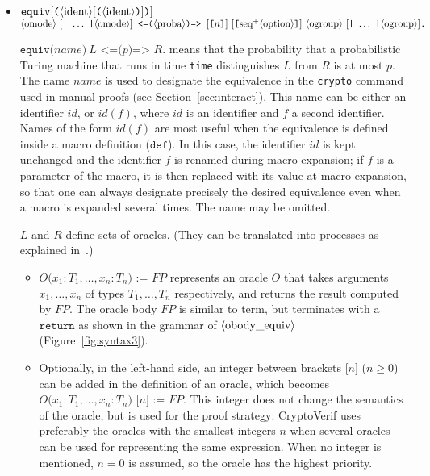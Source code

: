 \begin{itemize}
\ifchannels
\item $\texttt{equiv}[\texttt{(}\langle\textrm{ident}\rangle[\texttt{(}\langle\textrm{ident}\rangle\texttt{)}]\texttt{)}]$\\
$\nonterm{omode}\ [\texttt{|}\ \ldots\ \texttt{|}\nonterm{omode}]\texttt{ <=(}\nonterm{proba}\texttt{)=> }
[\texttt{[}n\texttt{]}]\ [\texttt{[}\neseq{option}\texttt{]}]\ \nonterm{ogroup}\ [\texttt{|}\ \ldots\ \texttt{|}\nonterm{ogroup}]\texttt{.}$

$\texttt{equiv(}\mathit{name}\texttt{)}\ L\texttt{ <=(}p\texttt{)=> }R\texttt{.}$ means that the
probability that a probabilistic Turing machine that runs in time
{\tt time} distinguishes $L$ from $R$ is at most $p$. The name $\mathit{name}$
is used to designate the equivalence in the \texttt{crypto} command used in manual proofs (see Section~\ref{sec:interact}). This name can be either an identifier $\mathit{id}$, or $\mathit{id}(f)$, where $\mathit{id}$ is an identifier and $f$ a second identifier. Names of the form $\mathit{id}(f)$ are most useful when the equivalence is defined inside a macro definition ($\texttt{def}$). In this case, the identifier $\mathit{id}$ is kept unchanged and the identifier $f$ is renamed during macro expansion; if $f$ is a parameter of the macro, it is then replaced with its value at macro expansion, so that one can always designate precisely the desired equivalence even when a macro is expanded several times.
The name may be omitted.

$L$ and $R$ define sets of oracles. (They can be translated into
processes as explained in~\cite{BlanchetEPrint05}.)
\begin{itemize}

\item $O\texttt{(}x_1:T_1, \ldots, x_n:T_n\texttt{) := }\mathit{FP}$ represents
an oracle $O$ that takes arguments $x_1, \ldots, x_n$ of types
$T_1, \ldots, T_n$ respectively, and returns the result computed by $\mathit{FP}$.
The oracle body $\mathit{FP}$ is similar to term, but terminates with
a $\texttt{return}$ as shown in the grammar of $\langle\textrm{obody\_equiv}\rangle$ 
(Figure~\ref{fig:syntax3}).

\item Optionally, in the left-hand side,
an integer between brackets $\texttt{[}n\texttt{]}$ ($n \geq 0$)
can be added in the definition of an oracle, which becomes 
$O\texttt{(}x_1:T_1, \ldots, x_n:T_n\texttt{) [}n\texttt{] := }\mathit{FP}$.
This integer does not change the semantics of the oracle, but is
used for the proof strategy: CryptoVerif uses preferably the oracles
with the smallest integers $n$ when several oracles can be used
for representing the same expression. When no integer is mentioned,
$n = 0$ is assumed, so the oracle has the highest priority.


\end{itemize}
\end{itemize}

